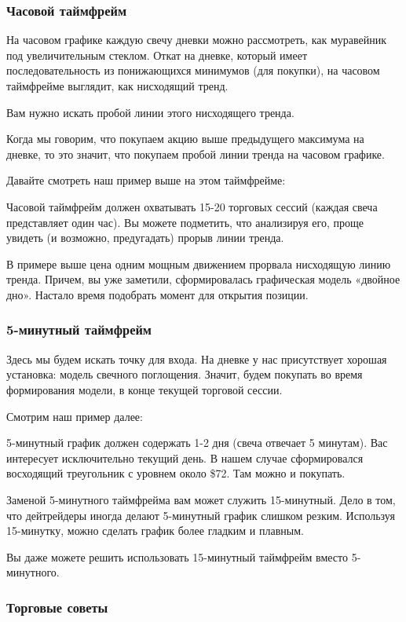 \documentclass{book}
\begin{document}
\subsubsection{Часовой таймфрейм}

На часовом графике каждую свечу дневки можно рассмотреть, как муравейник под увеличительным стеклом. Откат на дневке, который имеет последовательность из понижающихся минимумов (для покупки), на часовом таймфрейме выглядит, как нисходящий тренд.

Вам нужно искать пробой линии этого нисходящего тренда.

Когда мы говорим, что покупаем акцию выше предыдущего максимума на дневке, то это значит, что покупаем пробой линии тренда на часовом графике.

Давайте смотреть наш пример выше на этом таймфрейме:

Часовой таймфрейм должен охватывать 15-20 торговых сессий (каждая свеча представляет один час).  Вы можете подметить, что анализируя его, проще увидеть (и возможно, предугадать) прорыв линии тренда.

В примере выше цена одним мощным движением прорвала нисходящую линию
тренда. Причем, вы уже заметили, сформировалась графическая модель
«двойное дно». Настало время подобрать момент для открытия позиции.

\subsubsection{5-минутный таймфрейм}

Здесь мы будем искать точку для входа. На дневке у нас присутствует хорошая установка: модель свечного поглощения. Значит, будем покупать во время формирования модели, в конце текущей торговой сессии.

Смотрим наш пример далее:

5-минутный график должен содержать 1-2 дня (свеча отвечает 5 минутам). Вас интересует исключительно текущий день. В нашем случае сформировался восходящий треугольник с уровнем около \$72. Там можно и покупать.

Заменой 5-минутного таймфрейма вам может служить 15-минутный. Дело в том, что дейтрейдеры иногда делают 5-минутный график слишком резким. Используя 15-минутку, можно сделать график более гладким и плавным.

Вы даже можете решить использовать 15-минутный таймфрейм вместо
5-минутного.

\subsubsection{Торговые советы}
\end{document}
